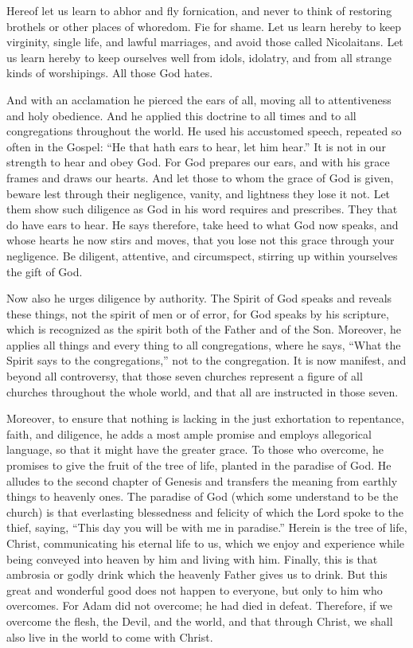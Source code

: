 Hereof let us learn to abhor and fly fornication, and never to think of restoring brothels or other places of whoredom. Fie for shame. Let us learn hereby to keep virginity, single life, and lawful marriages, and avoid those called Nicolaitans. Let us learn hereby to keep ourselves well from idols, idolatry, and from all strange kinds of worshipings. All those God hates.

And with an acclamation he pierced the ears of all, moving all to attentiveness and holy obedience. And he applied this doctrine to all times and to all congregations throughout the world. He used his accustomed speech, repeated so often in the Gospel: “He that hath ears to hear, let him hear.” It is not in our strength to hear and obey God. For God prepares our ears, and with his grace frames and draws our hearts. And let those to whom the grace of God is given, beware lest through their negligence, vanity, and lightness they lose it not. Let them show such diligence as God in his word requires and prescribes. They that do have ears to hear. He says therefore, take heed to what God now speaks, and whose hearts he now stirs and moves, that you lose not this grace through your negligence. Be diligent, attentive, and circumspect, stirring up within yourselves the gift of God.

Now also he urges diligence by authority. The Spirit of God speaks and reveals these things, not the spirit of men or of error, for God speaks by his scripture, which is recognized as the spirit both of the Father and of the Son. Moreover, he applies all things and every thing to all congregations, where he says, “What the Spirit says to the congregations,” not to the congregation. It is now manifest, and beyond all controversy, that those seven churches represent a figure of all churches throughout the whole world, and that all are instructed in those seven.

Moreover, to ensure that nothing is lacking in the just exhortation to repentance, faith, and diligence, he adds a most ample promise and employs allegorical language, so that it might have the greater grace. To those who overcome, he promises to give the fruit of the tree of life, planted in the paradise of God. He alludes to the second chapter of Genesis and transfers the meaning from earthly things to heavenly ones. The paradise of God (which some understand to be the church) is that everlasting blessedness and felicity of which the Lord spoke to the thief, saying, “This day you will be with me in paradise.” Herein is the tree of life, Christ, communicating his eternal life to us, which we enjoy and experience while being conveyed into heaven by him and living with him. Finally, this is that ambrosia or godly drink which the heavenly Father gives us to drink. But this great and wonderful good does not happen to everyone, but only to him who overcomes. For Adam did not overcome; he had died in defeat. Therefore, if we overcome the flesh, the Devil, and the world, and that through Christ, we shall also live in the world to come with Christ.

